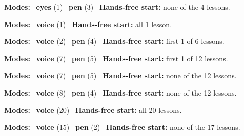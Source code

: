 \expandafter\def\csname hlchaptermodality6\endcsname{%
  {\small\noindent
    \textbf{Modes:} \hlsightsign{}~\textbf{eyes} (1) \quad \hlpensign{}~\textbf{pen} (3)\quad
    \hlvoicesign{}~\textbf{Hands-free start:} none of the 4 lessons.%
    \par}\medskip
}

\expandafter\def\csname hlchaptermodality7\endcsname{%
  {\small\noindent
    \textbf{Modes:} \hlvoicesign{}~\textbf{voice} (1)\quad
    \hlvoicesign{}~\textbf{Hands-free start:} all 1 lesson.%
    \par}\medskip
}

\expandafter\def\csname hlchaptermodality8\endcsname{%
  {\small\noindent
    \textbf{Modes:} \hlvoicesign{}~\textbf{voice} (2) \quad \hlpensign{}~\textbf{pen} (4)\quad
    \hlvoicesign{}~\textbf{Hands-free start:} first 1 of 6 lessons.%
    \par}\medskip
}

\expandafter\def\csname hlchaptermodality9\endcsname{%
  {\small\noindent
    \textbf{Modes:} \hlvoicesign{}~\textbf{voice} (7) \quad \hlpensign{}~\textbf{pen} (5)\quad
    \hlvoicesign{}~\textbf{Hands-free start:} first 1 of 12 lessons.%
    \par}\medskip
}

\expandafter\def\csname hlchaptermodality10\endcsname{%
  {\small\noindent
    \textbf{Modes:} \hlvoicesign{}~\textbf{voice} (7) \quad \hlpensign{}~\textbf{pen} (5)\quad
    \hlvoicesign{}~\textbf{Hands-free start:} none of the 12 lessons.%
    \par}\medskip
}

\expandafter\def\csname hlchaptermodality11\endcsname{%
  {\small\noindent
    \textbf{Modes:} \hlvoicesign{}~\textbf{voice} (8) \quad \hlpensign{}~\textbf{pen} (4)\quad
    \hlvoicesign{}~\textbf{Hands-free start:} none of the 12 lessons.%
    \par}\medskip
}

\expandafter\def\csname hlchaptermodality12\endcsname{%
  {\small\noindent
    \textbf{Modes:} \hlvoicesign{}~\textbf{voice} (20)\quad
    \hlvoicesign{}~\textbf{Hands-free start:} all 20 lessons.%
    \par}\medskip
}

\expandafter\def\csname hlchaptermodality13\endcsname{%
  {\small\noindent
    \textbf{Modes:} \hlvoicesign{}~\textbf{voice} (15) \quad \hlpensign{}~\textbf{pen} (2)\quad
    \hlvoicesign{}~\textbf{Hands-free start:} none of the 17 lessons.%
    \par}\medskip
}

